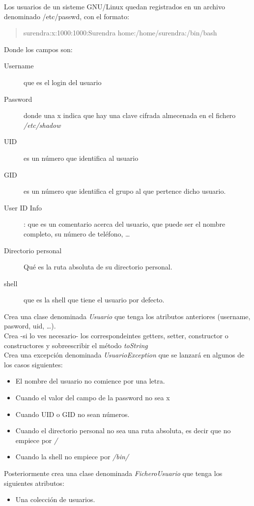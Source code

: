 \documentclass[addpoints,12pt]{exam}
\begin{document}
\begin{questions}
\question Los usuarios de un sisteme GNU/Linux quedan registrados en un archivo denominado /etc/passwd, con el formato:
\begin{quote}
surendra:x:1000:1000:Surendra home:/home/surendra:/bin/bash
\end{quote}
Donde los campos son:
\begin{description}
\item[Username] que es el login del usuario
\item[Password] donde una x indica que hay una clave cifrada almecenada en el fichero \emph{/etc/shadow} 
\item[UID] es un número que identifica al usuario
\item[GID] es un número que identifica el grupo al que pertence dicho usuario.
\item[User ID Info]: que es un comentario acerca del usuario, que puede ser el nombre completo, su número de teléfono, \dots
\item[Directorio personal] Qué es la ruta absoluta de su directorio personal.
\item[shell] que es la shell que tiene el usuario por defecto.
\end{description}
Crea una clase denominada \emph{Usuario} que tenga los atributos anteriores (username, pasword, uid, \dots).
\vspace{0.3cm}\\
Crea -si lo ves necesario- los correspondeintes getters, setter, constructor o constructores y sobreescribir el  método \emph{toString}
\vspace{0.3cm}\\
Crea una excepción denominada \emph{UsuarioException} que se lanzará en algunos de los casos siguientes:
\begin{itemize}
\item El nombre del usuario no comience por una letra.
\item Cuando el valor del campo de la password no sea x
\item Cuando UID o GID no sean números.
\item Cuando el directorio personal no sea una ruta absoluta, es decir que no empiece por \emph{/}
\item Cuando la shell no empiece por \emph{/bin/}
\end{itemize}
Posteriormente crea una clase denominada \emph{FicheroUsuario} que tenga los siguientes atributos:
\begin{itemize}
\item Una colección de usuarios.

\end{itemize}
\end{questions}
\end{document}
